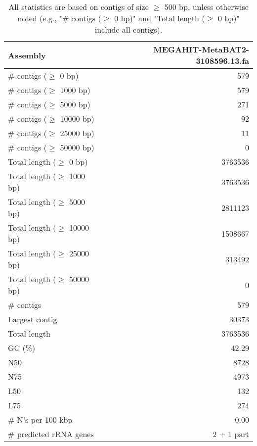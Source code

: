 \documentclass[12pt,a4paper]{article}
\begin{document}
\begin{table}[ht]
\begin{center}
\caption{All statistics are based on contigs of size $\geq$ 500 bp, unless otherwise noted (e.g., "\# contigs ($\geq$ 0 bp)" and "Total length ($\geq$ 0 bp)" include all contigs).}
\begin{tabular}{|l*{1}{|r}|}
\hline
Assembly & MEGAHIT-MetaBAT2-3108596.13.fa \\ \hline
\# contigs ($\geq$ 0 bp) & 579 \\ \hline
\# contigs ($\geq$ 1000 bp) & 579 \\ \hline
\# contigs ($\geq$ 5000 bp) & 271 \\ \hline
\# contigs ($\geq$ 10000 bp) & 92 \\ \hline
\# contigs ($\geq$ 25000 bp) & 11 \\ \hline
\# contigs ($\geq$ 50000 bp) & 0 \\ \hline
Total length ($\geq$ 0 bp) & 3763536 \\ \hline
Total length ($\geq$ 1000 bp) & 3763536 \\ \hline
Total length ($\geq$ 5000 bp) & 2811123 \\ \hline
Total length ($\geq$ 10000 bp) & 1508667 \\ \hline
Total length ($\geq$ 25000 bp) & 313492 \\ \hline
Total length ($\geq$ 50000 bp) & 0 \\ \hline
\# contigs & 579 \\ \hline
Largest contig & 30373 \\ \hline
Total length & 3763536 \\ \hline
GC (\%) & 42.29 \\ \hline
N50 & 8728 \\ \hline
N75 & 4973 \\ \hline
L50 & 132 \\ \hline
L75 & 274 \\ \hline
\# N's per 100 kbp & 0.00 \\ \hline
\# predicted rRNA genes & 2 + 1 part \\ \hline
\end{tabular}
\end{center}
\end{table}
\end{document}
